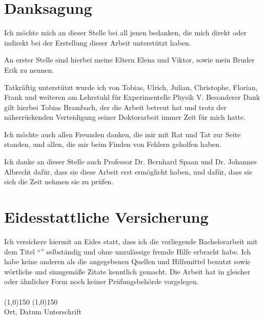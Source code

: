 
\section*{Danksagung}

Ich möchte mich an dieser Stelle bei all jenen bedanken, die mich direkt oder indirekt bei der Erstellung dieser Arbeit unterstützt haben.

An erster Stelle sind hierbei meine Eltern Elena und Viktor, sowie mein Bruder Erik zu nennen.

Tatkräftig unterstützt wurde ich von Tobias, Ulrich, Julian, Christophe, Florian, Frank und weiteren am Lehrstuhl für Experimentelle Physik V.
Besonderer Dank gilt hierbei Tobias Brambach, der die Arbeit betreut hat und trotz der näherrückenden Verteidigung seiner Doktorarbeit immer Zeit für mich hatte.

Ich möchte auch allen Freunden danken, die mir mit Rat und Tat zur Seite standen, und allen, die mir beim Finden von Fehlern geholfen haben.

Ich danke an dieser Stelle auch Professor Dr. Bernhard Spaan und Dr. Johannes Albrecht dafür, dass sie diese Arbeit erst ermöglicht haben, und dafür, dass sie sich die Zeit nehmen sie zu prüfen.


\newpage

\thispagestyle{empty}
\section*{Eidesstattliche Versicherung}
\noindent
Ich versichere hiermit an Eides statt, dass ich die vorliegende Bachelorarbeit mit dem Titel \enquote{\thetitle} selbständig und ohne unzulässige fremde Hilfe erbracht habe.
Ich habe keine anderen als die angegebenen Quellen und Hilfsmittel benutzt sowie wörtliche und sinngemäße Zitate kenntlich gemacht.
Die Arbeit hat in gleicher oder ähnlicher Form noch keiner Prüfungsbehörde vorgelegen.
\vspace*{1cm}
\ \\
\ \\
\line(1,0){150} \hfill \line(1,0){150} \\
Ort, Datum \hfill Unterschrift \hspace*{3cm}
\vspace*{1.5cm}

